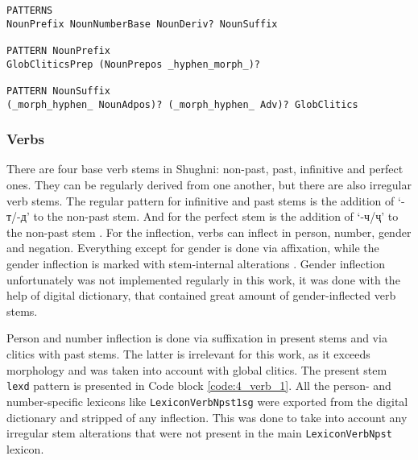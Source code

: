 \begin{code_frame}[float,floatplacement=!h]
    \begin{footnotesize}\codespacing
    \begin{verbatim}
PATTERNS
NounPrefix NounNumberBase NounDeriv? NounSuffix

PATTERN NounPrefix
GlobCliticsPrep (NounPrepos _hyphen_morph_)?

PATTERN NounSuffix
(_morph_hyphen_ NounAdpos)? (_morph_hyphen_ Adv)? GlobClitics
    \end{verbatim}
    \end{footnotesize}
    \tcblower
    \label{code:4_noun_2}
\end{code_frame}

\FloatBarrier

\subsubsection*{Verbs} \label{lexd_verbs}
There are four base verb stems in Shughni: non-past, past, infinitive and perfect ones. They can be regularly derived from one another, but there are also irregular verb stems. The regular pattern for infinitive and past stems is the addition of `-т/-д' to the non-past stem. And for the perfect stem is the addition of `-ч/ҷ' to the non-past stem \parencite[257]{parker_shughni_2023}. For the inflection, verbs can inflect in person, number, gender and negation. Everything except for gender is done via affixation, while the gender inflection is marked with stem-internal alterations \parencite[261]{parker_shughni_2023}. Gender inflection unfortunately was not implemented regularly in this work, it was done with the help of digital dictionary, that contained great amount of gender-inflected verb stems.

Person and number inflection is done via suffixation in present stems and via clitics with past stems. The latter is irrelevant for this work, as it exceeds morphology and was taken into account with global clitics. The present stem \texttt{lexd} pattern is presented in Code block \ref{code:4_verb_1}. All the person- and number-specific lexicons like \texttt{LexiconVerbNpst1sg} were exported from the digital dictionary and stripped of any inflection. This was done to take into account any irregular stem alterations that were not present in the main \texttt{LexiconVerbNpst} lexicon.

